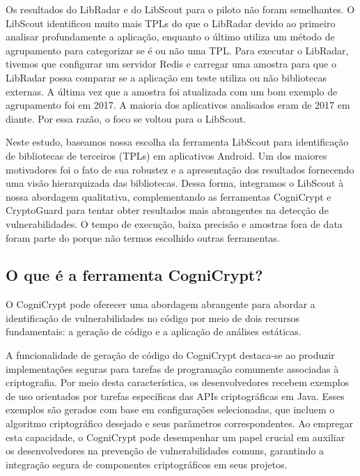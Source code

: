Os resultados do LibRadar e do LibScout para o piloto não foram semelhantes. O LibScout identificou muito mais TPLs do que o LibRadar devido ao primeiro analisar profundamente a aplicação, enquanto o último utiliza um método de agrupamento para categorizar se é ou não uma TPL. Para executar o LibRadar, tivemos que configurar um servidor Redis e carregar uma amostra para que o LibRadar possa comparar se a aplicação em teste utiliza ou não bibliotecas externas. A última vez que a amostra foi atualizada com um bom exemplo de agrupamento foi em 2017. A maioria dos aplicativos analisados eram de 2017 em diante. Por essa razão, o foco se voltou para o LibScout.



Neste estudo, baseamos nossa escolha da ferramenta LibScout para identificação de bibliotecas de terceiros (TPLs) em aplicativos Android. Um dos maiores motivadores foi o fato de sua robustez e a apresentação dos resultados fornecendo uma visão hierarquizada das bibliotecas. Dessa forma, integramos o LibScout à nossa abordagem qualitativa, complementando as ferramentas CogniCrypt e CryptoGuard para tentar obter resultados mais abrangentes na detecção de vulnerabilidades. O tempo de execução, baixa precisão e amostras fora de data foram parte do porque não termos escolhido outras ferramentas.

\subsection{O que é a ferramenta CogniCrypt?}

O CogniCrypt pode oferecer uma abordagem abrangente para abordar a identificação de vulnerabilidades no código por meio de dois recursos fundamentais: a geração de código e a aplicação de análises estáticas.

A funcionalidade de geração de código do CogniCrypt destaca-se ao produzir implementações seguras para tarefas de programação comumente associadas à criptografia. Por meio desta característica, os desenvolvedores recebem exemplos de uso orientados por tarefas específicas das APIs criptográficas em Java. Esses exemplos são gerados com base em configurações selecionadas, que incluem o algoritmo criptográfico desejado e seus parâmetros correspondentes. Ao empregar esta capacidade, o CogniCrypt pode desempenhar um papel crucial em auxiliar os desenvolvedores na prevenção de vulnerabilidades comuns, garantindo a integração segura de componentes criptográficos em seus projetos.


